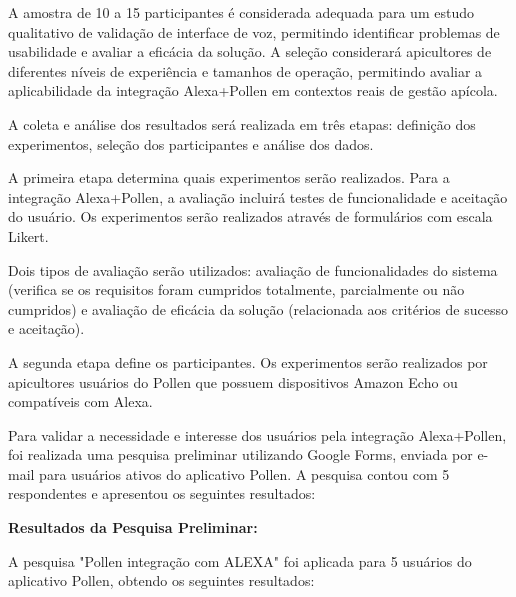 A amostra de 10 a 15 participantes é considerada adequada para um estudo qualitativo de validação de interface de voz, permitindo identificar problemas de usabilidade e avaliar a eficácia da solução. A seleção considerará apicultores de diferentes níveis de experiência e tamanhos de operação, permitindo avaliar a aplicabilidade da integração Alexa+Pollen em contextos reais de gestão apícola.

\label{sec:coleta-analise-resultados}

A coleta e análise dos resultados será realizada em três etapas: definição dos experimentos, seleção dos participantes e análise dos dados.

A primeira etapa determina quais experimentos serão realizados. Para a integração Alexa+Pollen, a avaliação incluirá testes de funcionalidade e aceitação do usuário. Os experimentos serão realizados através de formulários com escala Likert.

Dois tipos de avaliação serão utilizados: avaliação de funcionalidades do sistema (verifica se os requisitos foram cumpridos totalmente, parcialmente ou não cumpridos) e avaliação de eficácia da solução (relacionada aos critérios de sucesso e aceitação).

A segunda etapa define os participantes. Os experimentos serão realizados por apicultores usuários do Pollen que possuem dispositivos Amazon Echo ou compatíveis com Alexa. 

Para validar a necessidade e interesse dos usuários pela integração Alexa+Pollen, foi realizada uma pesquisa preliminar utilizando Google Forms, enviada por e-mail para usuários ativos do aplicativo Pollen. A pesquisa contou com 5 respondentes e apresentou os seguintes resultados:

\textbf{Resultados da Pesquisa Preliminar:}

A pesquisa "Pollen integração com ALEXA" foi aplicada para 5 usuários do aplicativo Pollen, obtendo os seguintes resultados:

